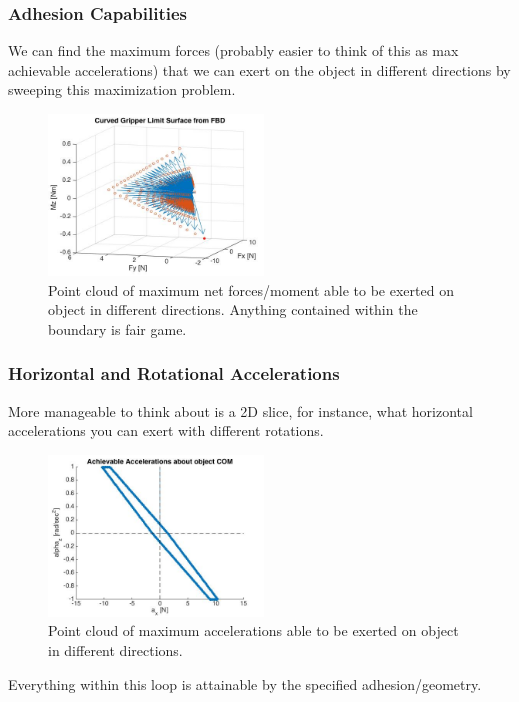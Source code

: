 \documentclass{beamer}
\begin{document}
\frame
{
\frametitle{ Adhesion Capabilities }

We can find the maximum forces (probably easier to think of this as max achievable accelerations) that we can exert on the object in different directions by sweeping this maximization problem. 

\begin{figure}[htb]
	\centering
	\includegraphics[width=2.25in]{images/CurvedGripperFBDSurfaceLimit.jpg}
	\caption{Point cloud of maximum net forces/moment able to be exerted on object in different directions. Anything contained within the boundary is fair game.}
\end{figure}
	
}


\frame
{
\frametitle{ Horizontal and Rotational Accelerations  }

More manageable to think about is a 2D slice, for instance, what horizontal accelerations you can exert with different rotations. 

\begin{figure}[htb]
	\centering
	\includegraphics[width=2.25in]{images/AxAzAccelerations.jpg}
	\caption{Point cloud of maximum accelerations able to be exerted on object in different directions.}
	\label{fig:accel}
\end{figure}

Everything within this loop is attainable by the specified adhesion/geometry. 
	
}
\end{document}
